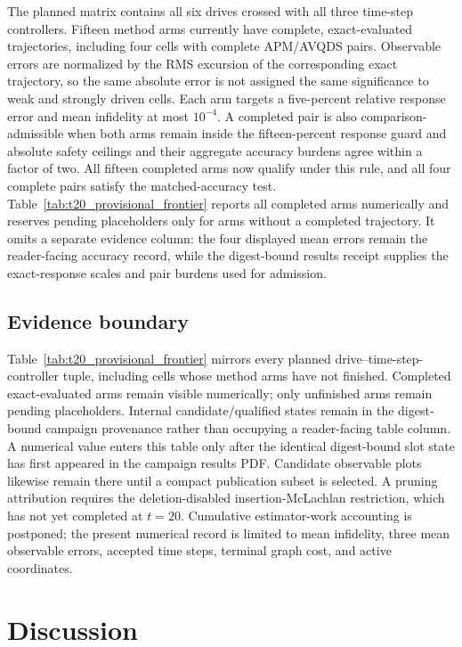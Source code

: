 \documentclass[
  reprint,
  amsmath,
  amssymb,
  aps,
  pra,
  nofootinbib,
  superscriptaddress,
  floatfix
]{revtex4-2}
\begin{document}
The planned matrix contains all six drives crossed with all three time-step
controllers.  Fifteen method arms currently have complete, exact-evaluated
trajectories, including four cells with complete APM/AVQDS pairs. Observable
errors are normalized by the RMS excursion of the corresponding exact
trajectory, so the same absolute error is not assigned the same significance
to weak and strongly driven cells. Each arm targets a five-percent relative
response error and mean infidelity at most $10^{-4}$. A completed pair is also
comparison-admissible when both arms remain inside the fifteen-percent
response guard and absolute safety ceilings and their aggregate accuracy
burdens agree within a factor of two. All fifteen completed arms now qualify
under this rule, and all four complete pairs satisfy the matched-accuracy test.
Table~\ref{tab:t20_provisional_frontier}
reports all completed arms numerically and reserves pending placeholders only
for arms without a completed trajectory.  It omits a separate evidence column:
the four displayed mean errors remain the reader-facing accuracy record, while
the digest-bound results receipt supplies the exact-response scales and pair
burdens used for admission.

\subsection{Evidence boundary}

Table~\ref{tab:t20_provisional_frontier} mirrors every planned
drive--time-step-controller tuple, including cells whose method arms have not
finished.  Completed exact-evaluated arms remain visible numerically; only
unfinished arms remain pending placeholders.  Internal candidate/qualified
states remain in the digest-bound campaign provenance rather than occupying a
reader-facing table column.  A numerical value enters this table only
after the identical digest-bound slot state has first appeared in the campaign
results PDF.  Candidate observable plots likewise remain there until a compact
publication subset is selected.  A pruning attribution requires the
deletion-disabled insertion-McLachlan restriction, which has not yet completed
at \(t=20\).
Cumulative estimator-work accounting is postponed; the present numerical
record is limited to mean infidelity, three mean observable errors, accepted
time steps, terminal graph cost, and active coordinates.


\section{Discussion}
\label{sec:discussion}
\end{document}
